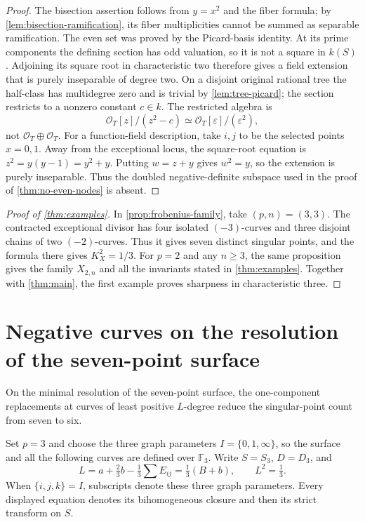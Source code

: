 \documentclass[11pt,reqno]{amsart}
\theoremstyle{definition}
\theoremstyle{remark}
\newcommand{\FF}{\mathbb F}
\numberwithin{equation}{section}
\begin{document}
\begin{proof}
The bisection assertion follows from $y=x^2$ and the fiber
formula; by \cref{lem:bisection-ramification}, its
fiber multiplicities cannot be summed as separable ramification.
The even set was proved by the Picard-basis identity.
At its prime components the defining section has odd valuation, so it
is not a square in $k(S)$. Adjoining its square root in characteristic
two therefore gives a field extension that is purely inseparable of
degree two. On a disjoint original rational tree the half-class has
multidegree zero and is trivial by \cref{lem:tree-picard}; the section
restricts to a nonzero constant $c\in k$. The restricted algebra is
\[
 \mathcal O_T[z]/(z^2-c)
   \simeq\mathcal O_T[\varepsilon]/(\varepsilon^2),
\]
not $\mathcal O_T\oplus\mathcal O_T$.
For a function-field description, take $i,j$ to
be the selected points $x=0,1$. Away from the exceptional locus, the
square-root equation is $z^2=y(y-1)=y^2+y$.
Putting $w=z+y$ gives $w^2=y$, so the extension is purely
inseparable. Thus the doubled negative-definite subspace used
in the proof of \cref{thm:no-even-nodes} is absent.
\end{proof}


\begin{proof}[Proof of \cref{thm:examples}]
In \cref{prop:frobenius-family}, take $(p,n)=(3,3)$.
The contracted exceptional divisor has four isolated $(-3)$-curves
and three disjoint chains of two $(-2)$-curves. Thus it gives seven
distinct singular points, and the formula there gives $K_X^2=1/3$.
For $p=2$ and any $n\ge3$, the same proposition gives the family
$X_{2,n}$ and all the invariants stated in \cref{thm:examples}.
Together with \cref{thm:main}, the first example proves sharpness in
characteristic three.
\end{proof}

\appendix
\section{Negative curves on the resolution of the seven-point surface}
\label{app:negative-curves}
On the minimal resolution of the seven-point surface, the one-component
replacements at curves of least positive $L$-degree reduce the
singular-point count from seven to six.

Set $p=3$ and choose the three graph parameters
$I=\{0,1,\infty\}$, so the surface and all the following curves are defined
over $\FF_3$. Write $S=S_3$, $D=D_3$, and
\[
 L=a+\tfrac23b-\tfrac13\sum E_{ij}=\tfrac13(B+b),\qquad L^2=\tfrac13.
\]
When $\{i,j,k\}=I$, subscripts denote these three graph parameters. Every displayed equation denotes its
bihomogeneous closure and then its strict transform on $S$.
\end{document}
